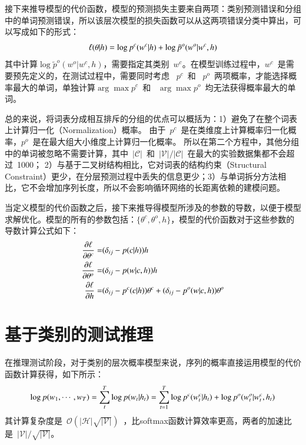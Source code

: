 接下来推导模型的代价函数，模型的预测损失主要来自两项：类别预测错误和分组中的单词预测错误，所以该层次模型的损失函数可以从这两项错误分类中算出，可以写成如下的形式：
\begin{equation}
\setlength{\abovedisplayskip}{10pt}
\setlength{\belowdisplayskip}{10pt}
\ell(\theta|h) =\log p^c(w^c|h) +\log \tilde  p^o(w^o|w^c,h)
\end{equation}
其中计算$\log \tilde  p^o(w^o|w^c,h)$，需要指定其类别~$w^c$。在模型训练过程中，$w^c$~是需要预先定义的，在测试过程中，需要同时考虑 ~$p^c$~和 ~$p^o$~两项概率，才能选择概率最大的单词，单独计算$\arg\max p^c$~和 ~$\arg\max p^o$~均无法获得概率最大的单词。

总的来说，将词表分成相互排斥的分组的优点可以概括为：1）避免了在整个词表上计算归一化（Normalization）概率。 由于~$p^c$~是在类维度上计算概率归一化概率，$p^o$~是在最大组大小维度上计算归一化概率。 所以在第二个方程中，其他分组中的单词被忽略不需要计算，其中~$\mathcal{|C|}$~和~$\mathcal{|V|}/\mathcal{|C|}$~在最大的实验数据集都不会超过~1000； 2）与基于二叉树结构相比，它对词表的结构约束（Structural Constraint）更少，在分层预测过程中丢失的信息更少；3）与单词拆分方法相比，它不会增加序列长度，所以不会影响循环网络的长距离依赖的建模问题。

当定义模型的代价函数之后，接下来推导得模型所涉及的参数的导数，以便于模型求解优化。模型的所有的参数包括：$\{\theta^c,\theta^o,h\}$，模型的代价函数对于这些参数的导数计算公式如下：
\begin{equation}
\setlength{\abovedisplayskip}{10pt}
\begin{split}
\frac{\partial \ell}{\partial \theta^c}=& (\delta_{ij}-p(c|h))h \\
\frac{\partial \ell}{\partial \theta^o}=&(\delta_{ij}-p(w|c,h))h \\
\frac{\partial \ell}{\partial h}=&(\delta_{ij}-p^c(c|h))\theta^c + (\delta_{ij}-p^o(w|c,h))\theta^o
\end{split}
\end{equation}


\section{基于类别的测试推理}
在推理测试阶段，对于类别的层次概率模型来说，序列的概率直接运用模型的代价函数计算获得，如下所示：
\begin{equation}\label{equ:class_inf}
\setlength{\abovedisplayskip}{10pt}
\setlength{\belowdisplayskip}{10pt}
\log p(w_1,\cdots, w_T)=\sum_t^T\log p(w_t|h_t) =\sum_{t=1}^{T}\log p^c(w^c_t|h_t) +\log p^o(w^o_t|w^c_t,h_t)
\end{equation}
其计算复杂度是~$\mathcal{O(|H|\sqrt{|\mathcal{V}|})}$~，比softmax函数计算效率更高，两者的加速比是~$|\mathcal{V}|/\sqrt{|\mathcal{V}|}$。

